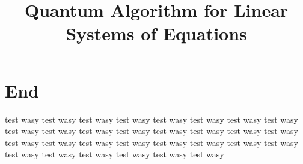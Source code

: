 \documentclass[conference]{IEEEtran}
\begin{document}
\title{Quantum Algorithm for Linear Systems of Equations\\
}

\author{
}

\maketitle


% 
% 
% 

%



\section {End}
test wasy test wasy test wasy test wasy test wasy test wasy
test wasy test wasy test wasy test wasy test wasy test wasy
test wasy test wasy test wasy test wasy test wasy test wasy
test wasy test wasy test wasy test wasy test wasy test wasy
test wasy test wasy test wasy test wasy test wasy test wasy
\end{document}
